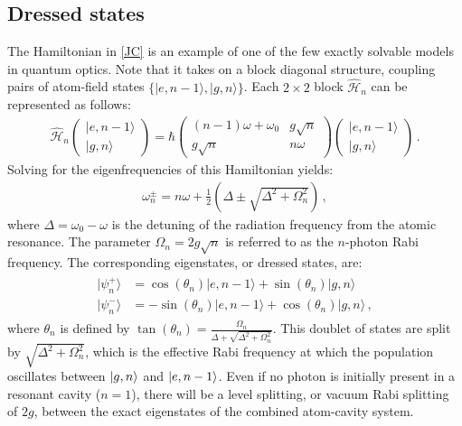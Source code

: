 \documentclass[../Thesis-IJspeert.tex]{subfiles}
\begin{document}
\subsection{Dressed states}
The Hamiltonian in \autoref{JC} is an example of one of the few exactly solvable models in quantum optics. Note that it takes on a block diagonal structure, coupling pairs of atom-field states $\{|e,n-1\rangle, |g, n\rangle\}$. Each $2\times2$ block $\hat{\mathcal{H}}_n$ can be represented as follows:
\begin{align}
\hat{\mathcal{H}}_n \begin{pmatrix}  \vert e, n-1\rangle \\ \vert g, n\rangle \end{pmatrix} = \hbar \begin{pmatrix} (n-1)\omega + \omega_0 & g\sqrt{n} \\ g\sqrt{n} & n\omega \end{pmatrix} \begin{pmatrix}  \vert e, n-1\rangle \\ \vert g, n\rangle \end{pmatrix}\,.
\end{align}
Solving for the eigenfrequencies of this Hamiltonian yields:
\begin{align}
\omega^\pm_n = n\omega + \frac{1}{2}\left( \Delta \pm \sqrt{\Delta^2 + \Omega_n^2}\right)\,,
\end{align}
where $\Delta = \omega_0 - \omega$ is the detuning of the radiation frequency from the atomic resonance. The parameter \(\Omega_n = 2g\sqrt{n}\) is referred to as the $n$-photon Rabi frequency. The corresponding eigenstates, or dressed states, are:
\begin{align}
\label{dressedstates}
\begin{split}
\vert  \psi^+_n\rangle &= \cos\left({\theta_n}\right) \vert e, n-1\rangle + \sin\left({\theta_n}\right) \vert g, n\rangle \\
\vert \psi^-_n\rangle &= - \sin\left({\theta_n}\right) \vert e, n-1\rangle + \cos\left({\theta_n}\right) \vert g, n\rangle \,,
\end{split}
\end{align}
where $\theta_n$ is defined by $\tan(\theta_n)=\frac{\Omega_n}{\Delta+\sqrt{\Delta^2+\Omega_n^2}}$. This doublet of states are split by $\sqrt{\Delta^2 + \Omega_n^2}$, which is the effective Rabi frequency at which the population oscillates between $\ket{g,n}$ and $\ket{e,n-1}$. Even if no photon is initially present in a resonant cavity ($n=1$), there will be a level splitting, or vacuum Rabi splitting of $2g$, between the exact eigenstates of the combined atom-cavity system.
\end{document}

